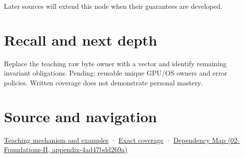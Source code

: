 Later sources will extend this node when their guarantees are developed.

\section{Recall and next depth}\label{appendix-7679107d057e-recall-and-next-depth}

Replace the teaching raw byte owner with a vector and identify remaining invariant obligations. Pending: reusable unique GPU/OS owners and error policies. Written coverage does not demonstrate personal mastery.

\section{Source and navigation}\label{appendix-7679107d057e-source-and-navigation}

\href{Continuous\%20Notes/Computing\%20Foundations\%20-\%20From\%20Bits\%20to\%20C++\%20and\%20Systems\%20APIs\#From\%20three\%20repairs\%20to\%20five\%20decisions\%20to\%20zero\%20boilerplate}{Teaching mechanism and examples} · \hyperref[appendix-fd090d982a15-m009---parts-127-147]{Exact coverage} · \href{../02-Foundations-II/main.pdf\#nameddest=appendix-4ad47bdd269a}{Dependency Map (02-Foundations-II, appendix-4ad47bdd269a)}

